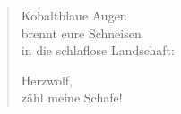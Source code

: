 

\begin{verse}
Kobaltblaue Augen\\
brennt eure Schneisen\\
in die schlaflose Landschaft:

Herzwolf,\\
zähl meine Schafe!
\end{verse}
